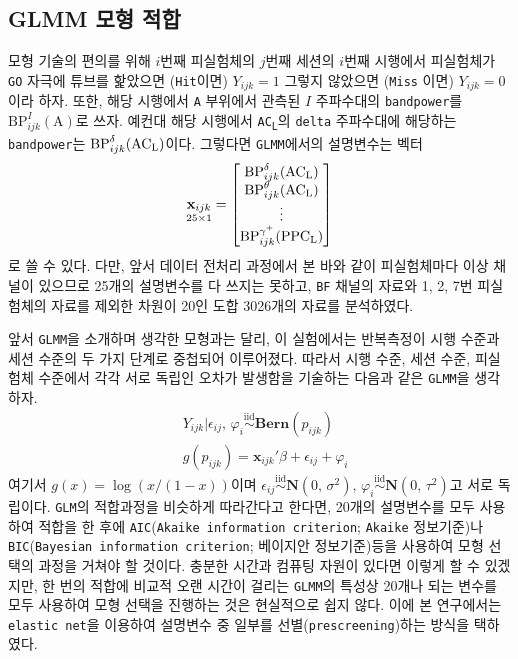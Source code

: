 \documentclass[11pt,onecolumn,twoside,a4size]{gsag3jnl}
\newcommand{\ACL}{AC\textsubscript{L}}
\newcommand{\PPCL}{PPC\textsubscript{L}}
\newcommand{\iid}{\stackrel{\mathrm{iid}}{\sim}}
\begin{document}
\subsection{GLMM 모형 적합}

모형 기술의 편의를 위해 $i$번째 피실험체의 $j$번째 세션의 $i$번째 시행에서 피실험체가 \texttt{GO} 자극에 튜브를 핥았으면 (\texttt{Hit}이면) $Y_{ijk}=1$ 그렇지 않았으면 (\texttt{Miss} 이면) $Y_{ijk}=0$이라 하자. 또한, 해당 시행에서 \texttt{A} 부위에서 관측된 $I$ 주파수대의 \texttt{bandpower}를 $\mathrm{BP}_{ijk}^I(\mathrm{A})$로 쓰자. 예컨대 해당 시행에서 \texttt{\ACL}의 \texttt{delta} 주파수대에 해당하는 \texttt{bandpower}는 $\mathrm{BP}_{ijk}^\delta(\mathrm{\ACL})$이다. 그렇다면 \texttt{GLMM}에서의 설명변수는 벡터
\begin{equation}
  \underset{25\times1}{\mathbf{x}_{ijk}}=\begin{bmatrix*}
    \mathrm{BP}_{ijk}^\delta(\mathrm{\ACL})\\
    \mathrm{BP}_{ijk}^\theta(\mathrm{\ACL})\\
    \vdots\\
    \mathrm{BP}_{ijk}^{\gamma^+}(\mathrm{\PPCL})\\
  \end{bmatrix*}
\end{equation}
로 쓸 수 있다. 다만, 앞서 데이터 전처리 과정에서 본 바와 같이 피실험체마다 이상 채널이 있으므로 25개의 설명변수를 다 쓰지는 못하고, \texttt{BF} 채널의 자료와 1, 2, 7번 피실험체의 자료를 제외한 차원이 20인 도합 3026개의 자료를 분석하였다.

앞서 \texttt{GLMM}을 소개하며 생각한 모형과는 달리, 이 실험에서는 반복측정이 시행 수준과 세션 수준의 두 가지 단계로 중첩되어 이루어졌다. 따라서 시행 수준, 세션 수준, 피실험체 수준에서 각각 서로 독립인 오차가 발생함을 기술하는 다음과 같은 \texttt{GLMM}을 생각하자.
\begin{align}\label{eq:glmm_example}
  &Y_{ijk}\vert\epsilon_{ij},\,\varphi_i\iid\mathbf{Bern}(p_{ijk})\\
  &g(p_{ijk})=\mathbf{x}_{ijk}'\beta+\epsilon_{ij}+\varphi_i\nonumber
\end{align}
여기서 $g(x)=\log(x/(1-x))$이며 $\epsilon_{ij}\iid\mathbf{N}(0,\,\sigma^2),\,\varphi_i\iid\mathbf{N}(0,\,\tau^2)$고 서로 독립이다. \texttt{GLM}의 적합과정을 비슷하게 따라간다고 한다면, 20개의 설명변수를 모두 사용하여 적합을 한 후에 \texttt{AIC}(\texttt{Akaike information criterion}; \texttt{Akaike} 정보기준)나 \texttt{BIC}(\texttt{Bayesian information criterion}; 베이지안 정보기준)등을 사용하여 모형 선택의 과정을 거쳐야 할 것이다. 충분한 시간과 컴퓨팅 자원이 있다면 이렇게 할 수 있겠지만, 한 번의 적합에 비교적 오랜 시간이 걸리는 \texttt{GLMM}의 특성상 20개나 되는 변수를 모두 사용하여 모형 선택을 진행하는 것은 현실적으로 쉽지 않다. 이에 본 연구에서는 \texttt{elastic net}을 이용하여 설명변수 중 일부를 선별(\texttt{prescreening})하는 방식을 택하였다.
\end{document}
